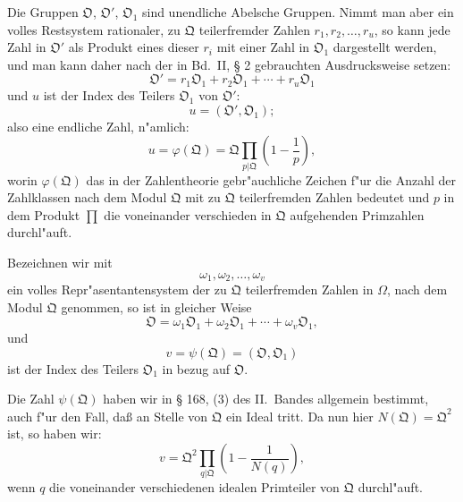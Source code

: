 \documentclass[12pt,a4paper]{article}
\theoremstyle{plain}
\begin{document}
Die Gruppen $\mathfrak{O}$, $\mathfrak{O}'$, $\mathfrak{O}_1$ sind unendliche Abelsche Gruppen. Nimmt man aber ein volles Restsystem rationaler, zu $\mathfrak{Q}$ teilerfremder Zahlen $r_1, r_2, \ldots, r_u$, so kann jede Zahl in $\mathfrak{O}'$ als Produkt eines dieser $r_i$ mit einer Zahl in $\mathfrak{O}_1$ dargestellt werden, und man kann daher nach der in Bd.~II, \S{} 2 gebrauchten Ausdrucksweise setzen:
\begin{equation}
\mathfrak{O}' = r_1\mathfrak{O}_1 + r_2\mathfrak{O}_1 + \cdots + r_u\mathfrak{O}_1
\tag{3}
\end{equation}
und $u$ ist der Index des Teilers $\mathfrak{O}_1$ von $\mathfrak{O}'$:
\begin{equation}
u = (\mathfrak{O}', \mathfrak{O}_1);
\tag{4}
\end{equation}
also eine endliche Zahl, n"amlich:
\begin{equation}
u = \varphi(\mathfrak{Q}) = \mathfrak{Q} \prod_{p|\mathfrak{Q}}\left(1 - \frac{1}{p}\right),
\tag{5}
\end{equation}
worin $\varphi(\mathfrak{Q})$ das in der Zahlentheorie gebr"auchliche Zeichen f"ur die Anzahl der Zahlklassen nach dem Modul $\mathfrak{Q}$ mit zu $\mathfrak{Q}$ teilerfremden Zahlen bedeutet und $p$ in dem Produkt $\prod$ die voneinander verschieden in $\mathfrak{Q}$ aufgehenden Primzahlen durchl"auft.

Bezeichnen wir mit
\[
\omega_1, \omega_2, \ldots, \omega_v
\]
ein volles Repr"asentantensystem der zu $\mathfrak{Q}$ teilerfremden Zahlen in $\Omega$, nach dem Modul $\mathfrak{Q}$ genommen, so ist in gleicher Weise
\begin{equation}
\mathfrak{O} = \omega_1\mathfrak{O}_1 + \omega_2\mathfrak{O}_1 + \cdots + \omega_v\mathfrak{O}_1,
\tag{6}
\end{equation}
und
\begin{equation}
v = \psi(\mathfrak{Q}) = (\mathfrak{O}, \mathfrak{O}_1)
\tag{7}
\end{equation}
ist der Index des Teilers $\mathfrak{O}_1$ in bezug auf $\mathfrak{O}$.

Die Zahl $\psi(\mathfrak{Q})$ haben wir in \S{} 168, (3) des II.~Bandes allgemein bestimmt, auch f"ur den Fall, da\ss{} an Stelle von $\mathfrak{Q}$ ein Ideal tritt. Da nun hier $N(\mathfrak{Q}) = \mathfrak{Q}^2$ ist, so haben wir:
\begin{equation}
v = \mathfrak{Q}^2 \prod_{q|\mathfrak{Q}} \left(1 - \frac{1}{N(q)}\right),
\tag{8}
\end{equation}
wenn $q$ die voneinander verschiedenen idealen Primteiler von $\mathfrak{Q}$ durchl"auft.
\end{document}
